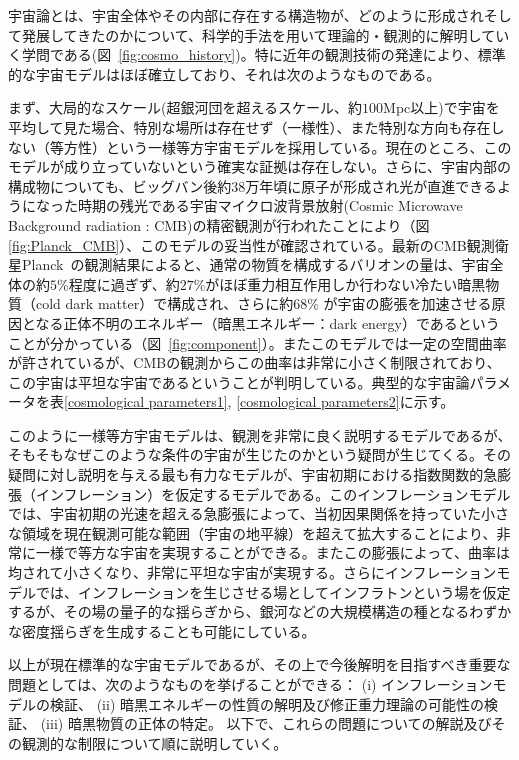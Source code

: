 宇宙論とは、宇宙全体やその内部に存在する構造物が、どのように形成されそして発展してきたのかについて、科学的手法を用いて理論的・観測的に解明していく学問である(図~\ref{fig:cosmo_history})。特に近年の観測技術の発達により、標準的な宇宙モデルはほぼ確立しており、それは次のようなものである。

まず、大局的なスケール(超銀河団を超えるスケール、約$100$Mpc以上)で宇宙を平均して見た場合、特別な場所は存在せず（一様性）、また特別な方向も存在しない（等方性）という一様等方宇宙モデルを採用している。現在のところ、このモデルが成り立っていないという確実な証拠は存在しない。さらに、宇宙内部の構成物についても、ビッグバン後約$38$万年頃に原子が形成され光が直進できるようになった時期の残光である宇宙マイクロ波背景放射(Cosmic Microwave Background radiation : CMB)の精密観測が行われたことにより（図\ref{fig:Planck_CMB}）、このモデルの妥当性が確認されている。最新のCMB観測衛星Planck~\citep{Ade:2013zuv}の観測結果によると、通常の物質を構成するバリオンの量は、宇宙全体の約$5$\%程度に過ぎず、約$27$\%がほぼ重力相互作用しか行わない冷たい暗黒物質（cold dark matter）で構成され、さらに約$68$\% が宇宙の膨張を加速させる原因となる正体不明のエネルギー（暗黒エネルギー：dark energy）であるということが分かっている（図~\ref{fig:component}）。またこのモデルでは一定の空間曲率が許されているが、CMBの観測からこの曲率は非常に小さく制限されており、この宇宙は平坦な宇宙であるということが判明している。典型的な宇宙論パラメータを表\ref{cosmological parameters1}, \ref{cosmological parameters2}に示す。

このように一様等方宇宙モデルは、観測を非常に良く説明するモデルであるが、そもそもなぜこのような条件の宇宙が生じたのかという疑問が生じてくる。その疑問に対し説明を与える最も有力なモデルが、宇宙初期における指数関数的急膨張（インフレーション）を仮定するモデルである。このインフレーションモデルでは、宇宙初期の光速を超える急膨張によって、当初因果関係を持っていた小さな領域を現在観測可能な範囲（宇宙の地平線）を超えて拡大することにより、非常に一様で等方な宇宙を実現することができる。またこの膨張によって、曲率は均されて小さくなり、非常に平坦な宇宙が実現する。さらにインフレーションモデルでは、インフレーションを生じさせる場としてインフラトンという場を仮定するが、その場の量子的な揺らぎから、銀河などの大規模構造の種となるわずかな密度揺らぎを生成することも可能にしている。

以上が現在標準的な宇宙モデルであるが、その上で今後解明を目指すべき重要な問題としては、次のようなものを挙げることができる：
(i) インフレーションモデルの検証、
(ii) 暗黒エネルギーの性質の解明及び修正重力理論の可能性の検証、
(iii) 暗黒物質の正体の特定。
以下で、これらの問題についての解説及びその観測的な制限について順に説明していく。

